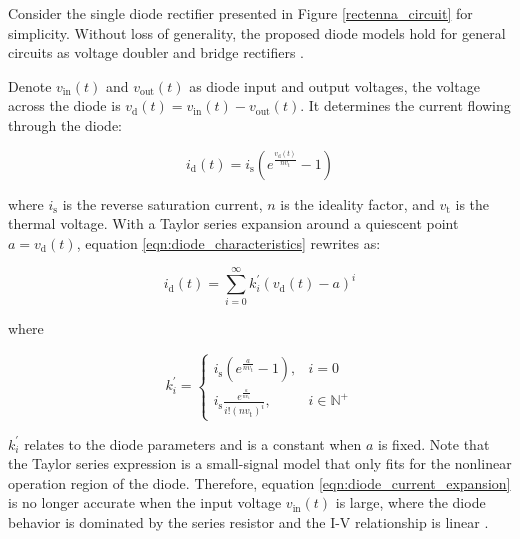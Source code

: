 Consider the single diode rectifier presented in Figure \ref{rectenna_circuit} for simplicity. Without loss of generality, the proposed diode models hold for general circuits as voltage doubler and bridge rectifiers \cite{Clerckx2017}.

Denote ${v_{{\text{in}}}}(t)$ and ${v_{{\text{out}}}}(t)$ as diode input and output voltages, the voltage across the diode is ${v_{\text{d}}}(t) = {v_{{\text{in}}}}(t) - {v_{{\text{out}}}}(t)$. It determines the current flowing through the diode:

\begin{equation}\label{eqn:diode_characteristics}
  {i_{\text{d}}}(t) = {i_{\text{s}}}\left( {{e^{\frac{{{v_{\text{d}}}(t)}}{{n{v_{\text{t}}}}}}} - 1} \right)
\end{equation}

where ${i_{\text{s}}}$ is the reverse saturation current, $n$ is the ideality factor, and ${{v_{\text{t}}}}$ is the thermal voltage. With a Taylor series expansion around a quiescent point $a = {v_{\text{d}}}(t)$, equation \ref{eqn:diode_characteristics} rewrites as:

\begin{equation}\label{eqn:diode_current_expansion}
  {i_{\text{d}}}(t) = \sum\limits_{i = 0}^\infty  {k_i^\prime } {\left( {{v_{\text{d}}}(t) - a} \right)^i}
\end{equation}

where

\begin{equation}\label{eqn:diode_k_prime}
  k_i^\prime  = \left\{ {
  \begin{array}{*{20}{c}}
    {{i_{\text{s}}}\left( {{e^{\frac{a}{{n{v_{\text{t}}}}}}} - 1} \right),}&{i = 0} \\
    {{i_{\text{s}}}\frac{{{e^{\frac{a}{{n{v_{\text{t}}}}}}}}}{{i!{{\left( {n{v_{\text{t}}}} \right)}^i}}},}&{i \in {\mathbb{N}^ + }}
  \end{array}} \right.
\end{equation}


$k_i^\prime $ relates to the diode parameters and is a constant when $a$ is fixed. Note that the Taylor series expression is a small-signal model that only fits for the nonlinear operation region of the diode. Therefore, equation \ref{eqn:diode_current_expansion} is no longer accurate when the input voltage ${v_{{\text{in}}}}(t)$ is large, where the diode behavior is dominated by the series resistor and the I-V relationship is linear \cite{Boaventura2013}.


